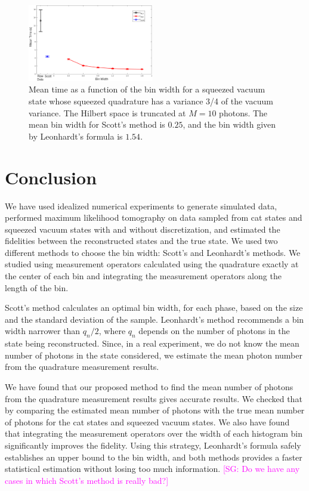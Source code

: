 \documentclass[
reprint,
superscriptaddress,
showpacs,
amsmath,
amssymb,
aps,
pra,
longbibliography
]{revtex4-1}
\providecommand{\aucmnt}[1]{#1}
\providecommand{\editcolor}[2]{\textcolor{#1}{#2}}
\providecommand{\aucmnt}[1]{}
\providecommand{\editcolor}[2]{#2}
\newcommand{\SGc}[1]{\aucmnt{\editcolor{magenta}{[SG: #1]}}}
\begin{document}
\begin{figure}
  \includegraphics[width=0.49\textwidth]{time-vacuocomprimido.eps}
  \caption{Mean time as a function of the bin width for a squeezed
    vacuum state whose squeezed quadrature has a variance 3/4 of the
    vacuum variance. The Hilbert space is truncated at $M=10$ photons. The
    mean bin width for Scott's method is $0.25$, and the bin width
    given by Leonhardt's formula is $1.54$.}
  \label{fig-time-squeezed}
\end{figure}

\section{Conclusion}
\label{conclusion}

We have used idealized numerical experiments to generate simulated
data, performed maximum likelihood tomography on data sampled
from cat states and squeezed vacuum states with and without
discretization, and estimated the fidelities between
the reconstructed states and the true state. We used two different
methods to choose the bin width: Scott's and Leonhardt's methods. We
studied using measurement operators calculated using the
quadrature exactly at the center of each bin and integrating the
measurement operators along the length of the bin. 

Scott's method calculates an optimal bin width, for each phase, based
on the size and the standard deviation of the sample. Leonhardt's
method recommends a bin width narrower than $q_n/2$, where $q_n$ 
depends on the number of photons in the state being reconstructed. 
Since, in a real experiment, we do not know the mean number of photons 
in the state considered, we estimate the mean photon number from the quadrature
measurement results.

We have found that our proposed method to find the mean number of
photons from the quadrature measurement results gives accurate
results. We checked that by comparing the estimated mean number of
photons with the true mean number of photons for the
cat states and squeezed vacuum states. We also have found that 
integrating the measurement operators over the width of each histogram 
bin significantly improves the fidelity. Using this strategy, Leonhardt's 
formula safely establishes an upper bound to the bin width, and both 
methods provides a faster statistical estimation without losing too much 
information.  
\SGc{Do we have any cases in which Scott's method is really bad?}
\end{document}
